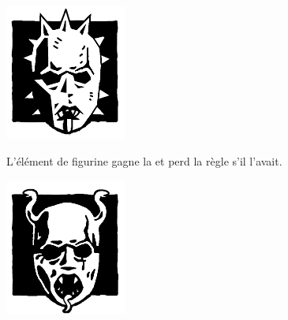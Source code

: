 \newcommand{\logosize}{4cm}
\begin{multicols}{2}\raggedcolumns
\begin{center}
\includegraphics[width=\logosize]{pics/cultofnabh.png}
\armyspecialruleentry{\cultofnabh}

L'élément de figurine gagne la \hatred{} et perd la règle \killerinstinct{} s'il l'avait.
\end{center}

\begin{center}
\includegraphics[width=\logosize]{pics/cultofyema.png}
\armyspecialruleentry{\cultofyema}


\end{center}
\end{multicols}
